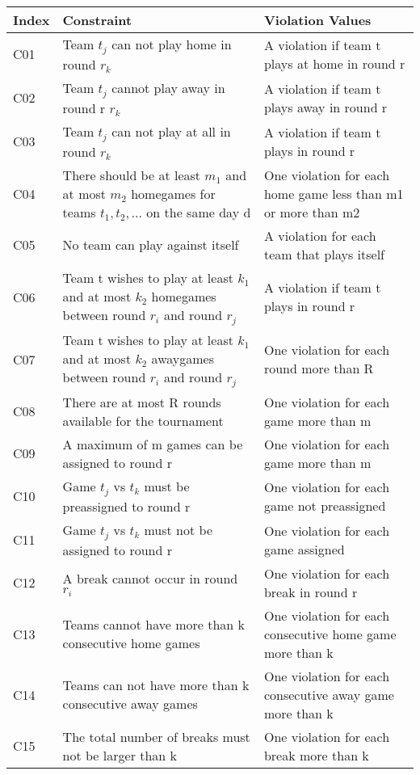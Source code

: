 \documentclass[•]{article}
\begin{document}
\begin{longtable}
{|p{}| p{}  p{} |}
\hline
Index & Constraint & Violation Values  \\
\hline
C01 & Team {$t_j$} can not play home in round {$r_k$}  & A violation if team t plays at home in round r \\
\hline
C02 & Team {$t_j$} cannot play away in round r {$r_k$} & A violation if team t plays away in round r \\
\hline
C03 & Team {$t_j$} can not play at all in round {$r_k$} & A violation if team t plays in round r \\
\hline
C04 & There should be at least {$m_1$} and at most {$m_2$} homegames for teams {$t_1, t_2,...$} on the same day d & One violation for each home game less than m1 or more than m2 \\ \hline
C05 & No team can play against itself & A violation for each team that plays itself  \\
\hline
C06 & Team t wishes to play at least $k_1$ and at most $k_2$ homegames between round $r_i$ and round $r_j$ & A violation if team t plays in round r\\ 
\hline
C07 & Team t wishes to play at least $k_1$ and at most $k_2$ awaygames between round $r_i$ and round $r_j$ & One violation for each round more than R\\ 
\hline
C08 & There are at most R rounds available for the tournament & One violation for each game more than m\\
\hline
C09 &  A maximum of m games can be assigned to round r & One violation for each game more than m \\
\hline
C10 &  Game {$t_j$} vs {$t_k$}  must be preassigned to round r & One violation for each game not preassigned \\
\hline
C11 & Game {$t_j$} vs {$t_k$} must not be assigned to round r & One violation for each game assigned\\
\hline
C12 & A break cannot occur in round {$r_i$} & One violation for each break in round r \\
\hline
C13 & Teams cannot have more than k consecutive home games & One violation for each consecutive home game more than k\\ 
\hline 
C14 & Teams can not have more than k consecutive away games & One violation for each consecutive away game more than k \\
\hline
C15 & The total number of breaks must not be larger than k & One violation for each break more than k\\

\end{longtable}
\end{document}

